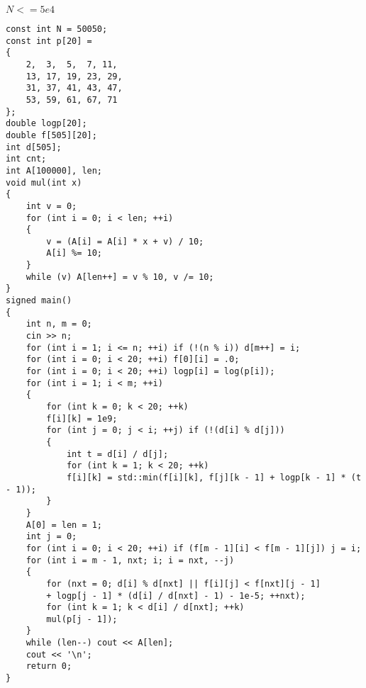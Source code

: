 \documentclass[E:/GsjzTle/main/main.tex]{subfiles}
\begin{document}
\(N <= 5e4\)

\begin{lstlisting}
const int N = 50050;
const int p[20] =
{
	2,  3,  5,  7, 11,
	13, 17, 19, 23, 29,
	31, 37, 41, 43, 47,
	53, 59, 61, 67, 71
};
double logp[20];
double f[505][20];
int d[505];
int cnt;
int A[100000], len;
void mul(int x)
{
	int v = 0;
	for (int i = 0; i < len; ++i)
	{
		v = (A[i] = A[i] * x + v) / 10;
		A[i] %= 10;
	}
	while (v) A[len++] = v % 10, v /= 10;
}
signed main()
{
	int n, m = 0;
	cin >> n;
	for (int i = 1; i <= n; ++i) if (!(n % i)) d[m++] = i;
	for (int i = 0; i < 20; ++i) f[0][i] = .0;
	for (int i = 0; i < 20; ++i) logp[i] = log(p[i]);
	for (int i = 1; i < m; ++i)
	{
		for (int k = 0; k < 20; ++k)
		f[i][k] = 1e9;
		for (int j = 0; j < i; ++j) if (!(d[i] % d[j]))
		{
			int t = d[i] / d[j];
			for (int k = 1; k < 20; ++k)
			f[i][k] = std::min(f[i][k], f[j][k - 1] + logp[k - 1] * (t - 1));
		}
	}
	A[0] = len = 1;
	int j = 0;
	for (int i = 0; i < 20; ++i) if (f[m - 1][i] < f[m - 1][j]) j = i;
	for (int i = m - 1, nxt; i; i = nxt, --j)
	{
		for (nxt = 0; d[i] % d[nxt] || f[i][j] < f[nxt][j - 1]
		+ logp[j - 1] * (d[i] / d[nxt] - 1) - 1e-5; ++nxt);
		for (int k = 1; k < d[i] / d[nxt]; ++k)
		mul(p[j - 1]);
	}
	while (len--) cout << A[len];
	cout << '\n';
	return 0;
}
\end{lstlisting}
\end{document}
